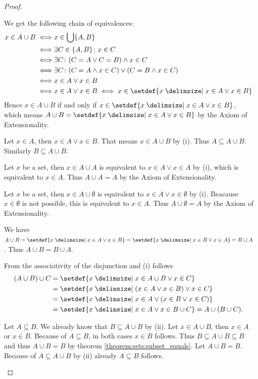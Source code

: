 \begin{proof}
    \begin{proofenumerate}
        \item We get the following chain of equivalences:
        \begin{align}\begin{split}x\in A\cup B \iff& x\in \bigcup\{A,B\}\\\iff&\exists C\in\{A,B\}\colon x\in C\\
        \iff& \exists C\colon (C=A\lor C=B)\land x\in C\\
        \iff& \exists C\colon (C=A\land x\in C)\lor (C=B\land x\in C)\\
        \iff& x\in A\lor x\in B\\
        \iff& x\in A\lor x\in B\iff x\in\setdef{x\given x\in A\lor x\in B}
        \end{split}\end{align}
        Hence $x\in A\cup B$ if and only if $x\in\setdef{x\given x\in A\lor x\in B}$, which means $A\cup B=\setdef{x\given x\in A\lor x\in B}$ by the Axiom of Extensionality.
        \item Let $x\in A$, then $x\in A\lor x\in B$. That means $x\in A\cup B$ by (i). Thus $A\subseteq A\cup B$. Similarly $B\subseteq A\cup B$.
        \item Let $x$ be a set, then $x\in A\cup A$ is equivalent to $x\in A\lor x\in A$ by (i), which is equivalent to $x\in A$. Thus $A\cup A=A$ by the Axiom of Extensionality.
        \item Let $x$ be a set, then $x\in A\cup\emptyset$ is equivalent to $x\in A\lor x\in\emptyset$ by (i). Beacause $x\in\emptyset$ is not possible, this is equivalent to $x\in A$. Thus $A\cup\emptyset=A$ by the Axiom of Extensionality.
        \item We have $A\cup B=\setdef{x\given x\in A\lor x\in B}=\setdef{x\given x\in B\lor x\in A}=B\cup A$. Thus $A\cup B=B\cup A$.
        \item From the associativity of the disjunction and (i) follows \begin{align}\begin{split}(A\cup B)\cup C&=\setdef{x\given x\in A\cup B\lor x\in C}\\&=\setdef{x\given (x\in A\lor x\in B)\lor x\in C}\\&=\setdef{x\given x\in A\lor (x\in B\lor x\in C)}\\&=\setdef{x\given x\in A\lor x\in B\cup C}=A\cup (B\cup C).\end{split}\end{align}
        \item \proofright Let $A\subseteq B$. We already know that $B\subseteq A\cup B$ by (ii). Let $x\in A\cup B$, then $x\in A$ or $x\in B$. Because of $A\subseteq B$, in both cases $x\in B$ follows. Thus $B\subseteq A\cup B\subseteq B$ and thus $A\cup B=B$ by theorem \ref{theorem:sets:subset_equals}. \proofleft Let $A\cup B=B$. Because of $A\subseteq A\cup B$ by (ii) already $A\subseteq B$ follows.
    \end{proofenumerate}
\end{proof}

